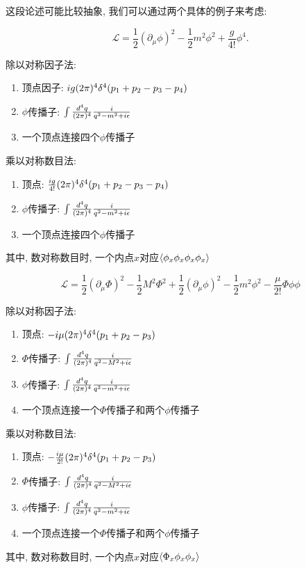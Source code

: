 这段论述可能比较抽象, 我们可以通过两个具体的例子来考虑:

\begin{example}[$\phi^4$理论]
    \begin{equation}
        \mathcal L=\frac12(\partial_\mu\phi)^2-\frac12m^2\phi^2+\frac g{4!}\phi^4.
    \end{equation}

    除以对称因子法:
    \begin{enumerate}
        \item 顶点因子: $ig(2\pi)^{4}\delta^4(p_1+p_2-p_3-p_4)$
        \item $\phi$传播子: $\int\frac{d^4q}{(2\pi)^{4}}\frac i{q^2-m^2+i\epsilon}$
        \item 一个顶点连接四个$\phi$传播子
    \end{enumerate}
    
    乘以对称数目法:
    \begin{enumerate}
        \item 顶点: $\frac{ig}{4!}(2\pi)^{4}\delta^4(p_1+p_2-p_3-p_4)$
        \item $\phi$传播子: $\int\frac{d^4q}{(2\pi)^{4}}\frac i{q^2-m^2+i\epsilon}$
        \item 一个顶点连接四个$\phi$传播子
    \end{enumerate}
    其中, 数对称数目时, 一个内点$x$对应$\braket{\phi_x\phi_x\phi_x\phi_x}$
\end{example}

\begin{example}
    \begin{equation}
        \mathcal L=\frac12(\partial_\mu\Phi)^2-\frac12M^2\Phi^2+\frac12(\partial_\mu\phi)^2-\frac12m^2\phi^2-\frac{\mu}{2!}\Phi\phi\phi
    \end{equation}

    除以对称因子法:
    \begin{enumerate}
        \item 顶点: $-i\mu(2\pi)^{4}\delta^4(p_1+p_2-p_3)$
        \item $\Phi$传播子: $\int\frac{d^4q}{(2\pi)^{4}}\frac i{q^2-M^2+i\epsilon}$
        \item $\phi$传播子: $\int\frac{d^4q}{(2\pi)^{4}}\frac i{q^2-m^2+i\epsilon}$
        \item 一个顶点连接一个$\Phi$传播子和两个$\phi$传播子
    \end{enumerate}

    乘以对称数目法:
    \begin{enumerate}
        \item 顶点: $-\frac{i\mu}{2!}(2\pi)^{4}\delta^4(p_1+p_2-p_3)$
        \item $\Phi$传播子: $\int\frac{d^4q}{(2\pi)^{4}}\frac i{q^2-M^2+i\epsilon}$
        \item $\phi$传播子: $\int\frac{d^4q}{(2\pi)^{4}}\frac i{q^2-m^2+i\epsilon}$
        \item 一个顶点连接一个$\Phi$传播子和两个$\phi$传播子
    \end{enumerate}
    其中, 数对称数目时, 一个内点$x$对应$\braket{\Phi_x\phi_x\phi_x}$
\end{example}

